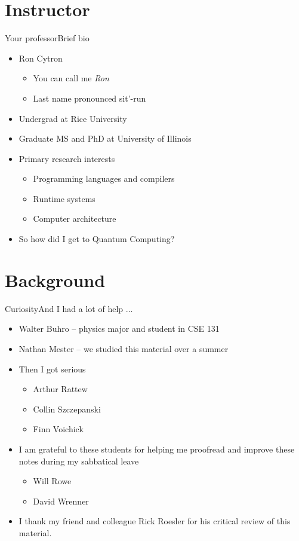 \section{Instructor}
\begin{frame}{Your professor}{Brief bio}
\begin{itemize}
    \item Ron Cytron
    \begin{itemize}
        \item You can call me \emph{Ron}
        \item Last name pronounced sit'-run
    \end{itemize}
    \item Undergrad at Rice University
    \item Graduate MS and PhD at University of Illinois
    \item Primary research interests
    \begin{itemize}
        \item Programming languages and compilers
        \item Runtime systems
        \item Computer architecture
    \end{itemize}
    \item So how did I get to Quantum Computing?
\end{itemize}
    
\end{frame}

\section{Background}
\begin{frame}{Curiosity}{And I had a lot of help $\ldots$}
\begin{itemize}
    \item Walter Buhro -- physics major and student in CSE 131
    \item Nathan Mester -- we studied this material over a summer
    \item Then I got serious
    \begin{itemize}
        \item Arthur Rattew
        \item Collin Szczepanski
        \item Finn Voichick
    \end{itemize}
    \item I am grateful to these students for helping me proofread and improve these notes during my sabbatical leave
    \begin{itemize}
        \item Will Rowe
        \item David Wrenner
    \end{itemize}
    \item I thank my friend and colleague Rick Roesler for his critical review of this material.
\end{itemize}
    
\end{frame}

